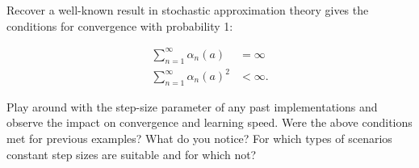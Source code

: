
\begin{exercise}

\phantom{}

Recover a well-known result in stochastic approximation theory gives the
conditions for convergence with probability 1:

\begin{align*}
    \sum_{n=1}^{\infty} \alpha_n(a) &= \infty \\
    \sum_{n=1}^{\infty} \alpha_n(a)^2 &< \infty.
\end{align*}

Play around with the step-size parameter of any past implementations and
observe the impact on convergence and learning speed. Were the above
conditions met for previous examples? What do you notice?
For which types of scenarios constant step sizes are suitable and for which not?

\end{exercise}


\begin{solution}

\phantom{}

\end{solution}

